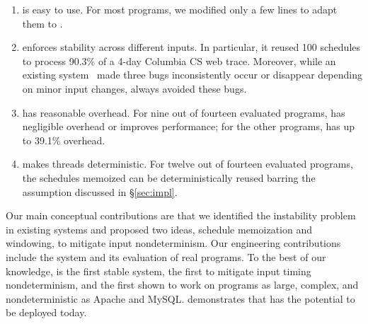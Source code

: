 \begin{enumerate}

\item \tern is easy to use.  For most programs, we modified only a few
  lines to adapt them to \tern.

\item \tern enforces stability across different inputs.  In particular, it
  reused 100 schedules to process 90.3\% of a 4-day Columbia CS web trace.
  Moreover, while an existing \dmt system~\cite{coredet:asplos10} made
  three bugs inconsistently occur or disappear depending on minor input
  changes, \tern always avoided these bugs.




\item \tern has reasonable overhead.  For nine out of fourteen
  evaluated programs, \tern has negligible overhead or improves
  performance; for the other programs, \tern has up to 39.1\%
  overhead.

\item \tern makes threads deterministic.  For twelve out of fourteen
  evaluated programs, the schedules \tern memoized can be deterministically
  reused barring the assumption discussed in \S\ref{sec:impl}.


\end{enumerate}

Our main conceptual contributions are that we identified the instability
problem in existing \dmt systems and proposed two ideas, schedule
memoization and windowing, to mitigate input nondeterminism.  Our
engineering contributions include the \tern system and its evaluation of
real programs.  To the best of our knowledge, \tern is the first stable
\dmt system, the first to mitigate input timing nondeterminism, and the
first shown to work on programs as large, complex, and nondeterministic as
Apache and MySQL.  \tern demonstrates that \dmt has the potential to be
deployed today.

